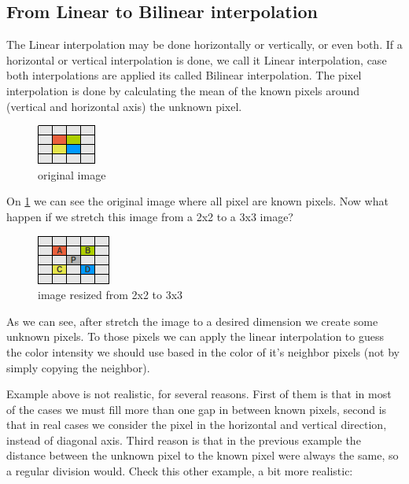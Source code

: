 \documentclass{article}
\begin{document}
\subsection{From Linear to Bilinear interpolation}

	The Linear interpolation may be done horizontally or vertically, or even both. If a horizontal or vertical interpolation is done, we call it
	Linear interpolation, case both interpolations are applied its called Bilinear interpolation.	
	The pixel interpolation is done by calculating the mean of the known pixels around (vertical and horizontal axis) the unknown pixel. 

	\begin{figure} [H]
		\centering
		\includegraphics[scale=1]{images/bilinear_interpolation_1}
		\caption{original image \label{bilinear1}}
	\end{figure}

	On \ref{bilinear1} we can see the original image where all pixel are known pixels. Now what happen if we stretch this image 
	from a 2x2 to a 3x3 image?
	
	\begin{figure} [H]
		\centering
		\includegraphics[scale=1]{images/bilinear_interpolation_2}
		\caption{image resized from 2x2 to 3x3 \label{bilinear2}}
	\end{figure}

	As we can see, after stretch the image to a desired dimension we create some unknown pixels. To those pixels we can apply the linear interpolation 
	to guess the color intensity we should use based in the color of it's neighbor pixels (not by simply copying the neighbor).

	Example above is not realistic, for several reasons. First of them is that in most of the cases we must fill more than one gap in between known pixels,
	second is that in real cases we consider the pixel in the horizontal and vertical direction, instead of diagonal axis. Third reason is that in the 
	previous example the distance between the unknown pixel to the known pixel were always the same, so a regular division would. 
	Check this other example, a bit more realistic:
	
\end{document}

